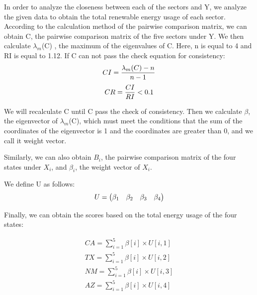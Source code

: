 \documentclass[a4paper,11pt]{article}
\begin{document}
\par In order to analyze the closeness between each of the sectors and Y, we analyze the given data to obtain the total renewable energy usage of each sector. According to the calculation method of the pairwise comparison matrix, we can obtain C, the pairwise comparison matrix of the five sectors under Y. We then calculate $\lambda_m$(C) , the maximum of the eigenvalues of C. Here, n is equal to 4 and RI is equal to 1.12.\cite{6} If C can not pass the check equation for consistency:
\begin{equation}
    \centering
    CI=\frac{ \lambda_m(C)-n }{ n-1 }
\end{equation}
\begin{equation}
        \centering
    CR=\frac{ CI }{ RI }<0.1 
\end{equation}

\par We will recalculate C until C pass the check of consistency. Then we calculate $\beta$, the eigenvector of $\lambda_m$(C), which must meet the conditions that the sum of the coordinates of the eigenvector is 1 and the coordinates are greater than 0, and we call it weight vector.
\par Similarly, we can also obtain $B_i$, the pairwise comparison matrix of the four states under $X_i$, and $\beta_i$, the weight vector of $X_i$.
\par We define U as follows: %
\begin{equation}
    \centering
U=\begin{pmatrix} \beta_1 & \beta_2 & \beta_3 & \beta_4\end{pmatrix}
\end{equation}
\par Finally, we can obtain the scores based on the total energy usage of the four states:

\begin{equation}
    \label{AHP_result}
    \begin{array}{l}
    \displaystyle CA=\sum_{i=1}^{5}\beta[i] \times U[i,1] \\
    \displaystyle TX=\sum_{i=1}^{5}\beta[i] \times U[i,2] \\
    \displaystyle NM=\sum_{i=1}^{5}\beta[i] \times U[i,3] \\
    \displaystyle AZ=\sum_{i=1}^{5}\beta[i] \times U[i,4]
    \end{array}
\end{equation}

\end{document}

